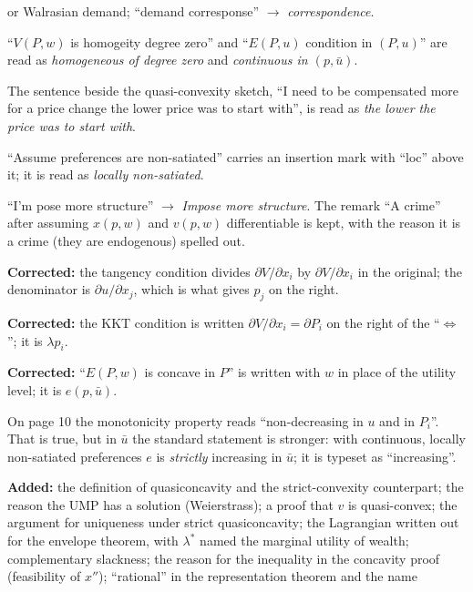 \documentclass[11pt]{article}
\begin{document}
\begin{transcriptnotes}
{        or Walrasian demand}; ``demand corresponse'' $\to$ \emph{correspondence}.
  \item ``$V(P,w)$ is homogeity degree zero'' and ``$E(P,u)$ condition in
        $(P,u)$'' are read as \emph{homogeneous of degree zero} and
        \emph{continuous in $(p,\bar u)$}.
  \item The sentence beside the quasi-convexity sketch, ``I need to be compensated
        more for a price change the lower price was to start with'', is read as
        \emph{the lower the price was to start with}.
  \item ``Assume preferences are non-satiated'' carries an insertion mark with
        ``loc'' above it; it is read as \emph{locally non-satiated}.
  \item ``I'm pose more structure'' $\to$ \emph{Impose more structure}. The
        remark ``A crime'' after assuming $x(p,w)$ and $v(p,w)$ differentiable is
        kept, with the reason it is a crime (they are endogenous) spelled out.
  \item \textbf{Corrected:} the tangency condition divides
        $\partial V/\partial x_i$ by $\partial V/\partial x_i$ in the original;
        the denominator is $\partial u/\partial x_j$, which is what gives $p_j$ on
        the right.
  \item \textbf{Corrected:} the KKT condition is written
        $\partial V/\partial x_i=\partial P_i$ on the right of the ``$\iff$''; it
        is $\lambda p_i$.
  \item \textbf{Corrected:} ``$E(P,w)$ is concave in $P$'' is written with $w$ in
        place of the utility level; it is $e(p,\bar u)$.
  \item On page 10 the monotonicity property reads ``non-decreasing in $u$ and in
        $P_i$''. That is true, but in $\bar u$ the standard statement is stronger:
        with continuous, locally non-satiated preferences $e$ is \emph{strictly}
        increasing in $\bar u$; it is typeset as ``increasing''.
  \item \textbf{Added:} the definition of quasiconcavity and the strict-convexity
        counterpart; the reason the UMP has a solution (Weierstrass); a proof that
        $v$ is quasi-convex; the argument for uniqueness under strict
        quasiconcavity; the Lagrangian written out for the envelope theorem, with
        $\lambda^{*}$ named the marginal utility of wealth; complementary
        slackness; the reason for the inequality in the concavity proof (feasibility
        of $x''$); ``rational'' in the representation theorem and the name

\end{transcriptnotes}
\end{document}
